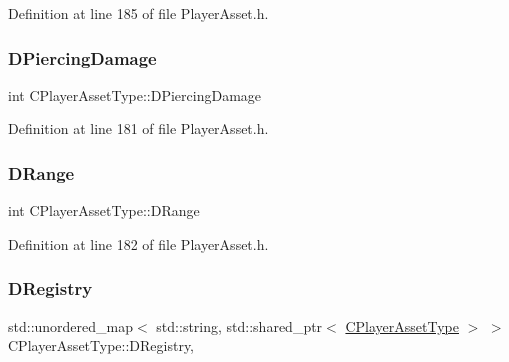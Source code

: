 Definition at line 185 of file Player\+Asset.\+h.

\hypertarget{classCPlayerAssetType_af7303175365306fb69e5ff9170b72234}{}\label{classCPlayerAssetType_af7303175365306fb69e5ff9170b72234} 
\subsubsection{\texorpdfstring{D\+Piercing\+Damage}{DPiercingDamage}}
{\footnotesize\ttfamily int C\+Player\+Asset\+Type\+::\+D\+Piercing\+Damage\hspace{0.3cm}{\ttfamily [protected]}}



Definition at line 181 of file Player\+Asset.\+h.

\hypertarget{classCPlayerAssetType_a1204a9470d8940fdb81a63670a0f6779}{}\label{classCPlayerAssetType_a1204a9470d8940fdb81a63670a0f6779} 
\subsubsection{\texorpdfstring{D\+Range}{DRange}}
{\footnotesize\ttfamily int C\+Player\+Asset\+Type\+::\+D\+Range\hspace{0.3cm}{\ttfamily [protected]}}



Definition at line 182 of file Player\+Asset.\+h.

\hypertarget{classCPlayerAssetType_a24f4ccd06fbddacc936e31a2f1f12ed5}{}\label{classCPlayerAssetType_a24f4ccd06fbddacc936e31a2f1f12ed5} 
\subsubsection{\texorpdfstring{D\+Registry}{DRegistry}}
{\footnotesize\ttfamily std\+::unordered\+\_\+map$<$ std\+::string, std\+::shared\+\_\+ptr$<$ \hyperlink{classCPlayerAssetType}{C\+Player\+Asset\+Type} $>$ $>$ C\+Player\+Asset\+Type\+::\+D\+Registry\hspace{0.3cm}{\ttfamily [static]}, {\ttfamily [protected]}}



